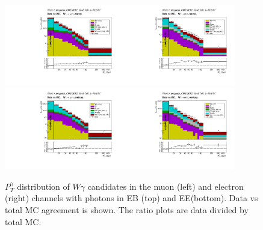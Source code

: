 \begin{figure}[htb]
  \begin{center}
   \includegraphics[width=0.45\textwidth]{../figs/figs_v11/MUON_WGamma/PrepareYields/c_TotalDATAvsMC_Barrel__phoEt.pdf}\includegraphics[width=0.45\textwidth]{../figs/figs_v11/ELECTRON_WGamma/PrepareYields/c_TotalDATAvsMC_Barrel__phoEt.pdf}
   \includegraphics[width=0.45\textwidth]{../figs/figs_v11/MUON_WGamma/PrepareYields/c_TotalDATAvsMC_Endcap__phoEt.pdf}\includegraphics[width=0.45\textwidth]{../figs/figs_v11/ELECTRON_WGamma/PrepareYields/c_TotalDATAvsMC_Endcap__phoEt.pdf}
  \caption{$P_T^{\gamma}$ distribution of $W\gamma$ candidates in the muon (left) and electron (right) channels with photons in EB (top) and EE(bottom). Data vs total MC agreement is shown. The ratio plots are data divided by total MC. }
  \label{fig:DATAvsMC}
  \end{center}
\end{figure}
